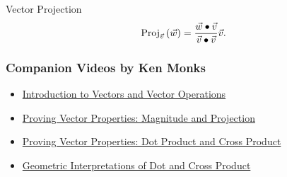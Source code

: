 \begin{definition}{Vector Projection}
$$\mathrm{Proj}_{\vec{v}}\left({\vec{w}}\right)=\frac{\vec{w}\bullet\vec{v}}{\vec{v}\bullet\vec{v}}\vec{v}. $$
\end{definition}

\subsubsection*{Companion Videos by Ken Monks}
\begin{itemize}
\item \href{https://www.youtube.com/watch?v=bSQFuWXoCsA}{Introduction to Vectors and Vector Operations}
\item \href{https://www.youtube.com/watch?v=PH_6qc_U_Ak}{Proving Vector Properties: Magnitude and Projection}
\item \href{https://www.youtube.com/watch?v=jOqwuD10_is}{Proving Vector Properties: Dot Product and Cross Product}
\item \href{https://www.youtube.com/watch?v=JS2XEF9gKZQ}{Geometric Interpretations of Dot and Cross Product}
\end{itemize}
\renewcommand\thesubsection{\thesection.\arabic{subsection}}